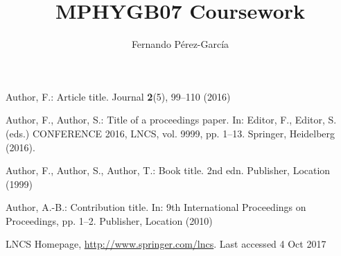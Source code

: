 \documentclass[runningheads]{llncs}
\begin{document}
%
\title{MPHYGB07 Coursework}
%
%
\author{Fernando Pérez-García }
%
%
%
\maketitle              %
%
%
%
%
%





%
%
%
% 
% 
%
\begin{thebibliography}{8}
Author, F.: Article title. Journal \textbf{2}(5), 99--110 (2016)

Author, F., Author, S.: Title of a proceedings paper. In: Editor,
F., Editor, S. (eds.) CONFERENCE 2016, LNCS, vol. 9999, pp. 1--13.
Springer, Heidelberg (2016). 

Author, F., Author, S., Author, T.: Book title. 2nd edn. Publisher,
Location (1999)

Author, A.-B.: Contribution title. In: 9th International Proceedings
on Proceedings, pp. 1--2. Publisher, Location (2010)

LNCS Homepage, \url{http://www.springer.com/lncs}. Last accessed 4
Oct 2017
\end{thebibliography}


% 
% 
\end{document}
